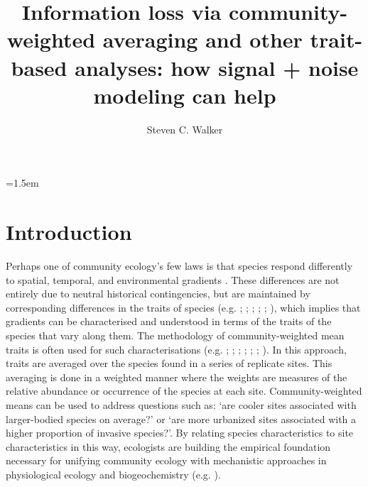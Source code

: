 \documentclass[12pt]{ecology}
\title{Information loss via community-weighted averaging and other trait-based analyses:  how signal + noise modeling can help}
\author{Steven C. Walker}
\begin{document}
\maketitle
\raggedright
\parindent=1.5em

\abstract{

}

\section{Introduction}

Perhaps one of community ecology's few laws is that species respond differently to spatial, temporal, and environmental gradients \citep{Gleason1917,Whittaker1967}.  These differences are not entirely due to neutral historical contingencies, but are maintained by corresponding differences in the traits of species (e.g. ; ; ; ; ; ), which implies that gradients can be characterised and understood in terms of the traits of the species that vary along them.  The methodology of community-weighted mean traits is often used for such characterisations (e.g. ; ; ; ; ; ; ).  In this approach, traits are averaged over the species found in a series of replicate sites.  This averaging is done in a weighted manner where the weights are measures of the relative abundance or occurrence of the species at each site.  Community-weighted means can be used to address questions such as:  `are cooler sites associated with larger-bodied species on average?' or `are more urbanized sites associated with a higher proportion of invasive species?'.  By relating species characteristics to site characteristics in this way, ecologists are building the empirical foundation necessary for unifying community ecology with mechanistic approaches in physiological ecology and biogeochemistry (e.g. ).
\end{document}
